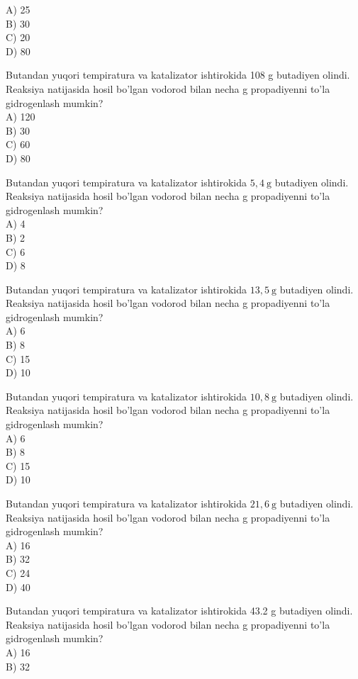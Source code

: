 A) 25\\
B) 30\\
C) 20\\
D) 80
  \item Butandan yuqori tempiratura va katalizator ishtirokida 108 g butadiyen olindi. Reaksiya natijasida hosil bo'lgan vodorod bilan necha g propadiyenni to'la gidrogenlash mumkin?\\
A) 120\\
B) 30\\
C) 60\\
D) 80
  \item Butandan yuqori tempiratura va katalizator ishtirokida $5,4 \mathrm{~g}$ butadiyen olindi. Reaksiya natijasida hosil bo'lgan vodorod bilan necha g propadiyenni to'la gidrogenlash mumkin?\\
A) 4\\
B) 2\\
C) 6\\
D) 8
  \item Butandan yuqori tempiratura va katalizator ishtirokida $13,5 \mathrm{~g}$ butadiyen olindi. Reaksiya natijasida hosil bo'lgan vodorod bilan necha g propadiyenni to'la gidrogenlash mumkin?\\
A) 6\\
B) 8\\
C) 15\\
D) 10
  \item Butandan yuqori tempiratura va katalizator ishtirokida $10,8 \mathrm{~g}$ butadiyen olindi. Reaksiya natijasida hosil bo'lgan vodorod bilan necha g propadiyenni to'la gidrogenlash mumkin?\\
A) 6\\
B) 8\\
C) 15\\
D) 10
  \item Butandan yuqori tempiratura va katalizator ishtirokida $21,6 \mathrm{~g}$ butadiyen olindi. Reaksiya natijasida hosil bo'lgan vodorod bilan necha g propadiyenni to'la gidrogenlash mumkin?\\
A) 16\\
B) 32\\
C) 24\\
D) 40
  \item Butandan yuqori tempiratura va katalizator ishtirokida 43.2 g butadiyen olindi. Reaksiya natijasida hosil bo'lgan vodorod bilan necha g propadiyenni to'la gidrogenlash mumkin?\\
A) 16\\
B) 32\\
